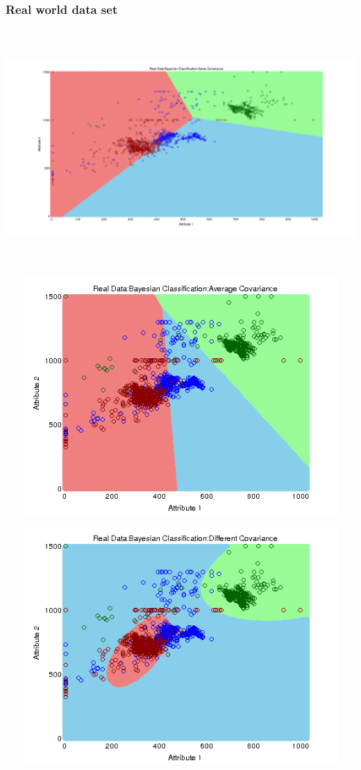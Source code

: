 \documentclass[a4paper]{article}
\begin{document}
		\subsubsection{Real world data set}
			\centerline{\includegraphics[width=160mm,height=90mm]{plots/bayes/real/same_cov.png}}
 			\centerline{\includegraphics[width=160mm,height=90mm]{plots/bayes/real/avg_cov.png}}
 			\centerline{\includegraphics[width=160mm,height=90mm]{plots/bayes/real/diff_cov.png}}
	
\end{document}
